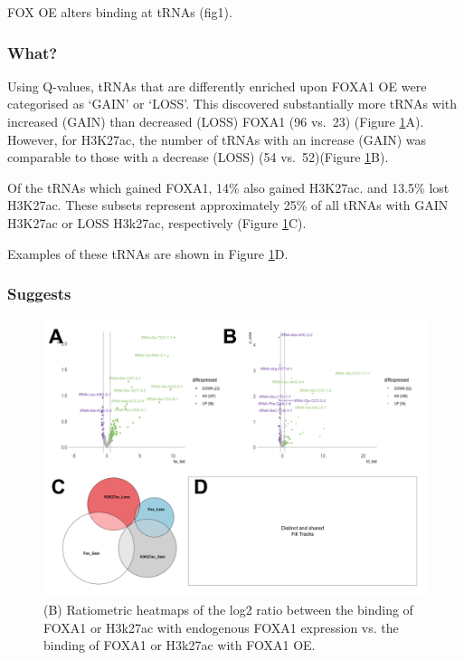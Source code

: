 \documentclass[
  12pt,
]{article}
\begin{document}
FOX OE alters binding at tRNAs (fig1).

\hypertarget{what}{%
\subsubsection{What?}\label{what}}

Using Q-values, tRNAs that are differently enriched upon FOXA1 OE were categorised as `GAIN' or `LOSS'.
This discovered substantially more tRNAs with increased (GAIN) than decreased (LOSS) FOXA1 (96 vs.~23) (Figure \ref{fig:results-2}A).
However, for H3K27ac, the number of tRNAs with an increase (GAIN) was comparable to those with a decrease (LOSS) (54 vs.~52)(Figure \ref{fig:results-2}B).

Of the tRNAs which gained FOXA1, 14\% also gained H3K27ac.
and 13.5\% lost H3K27ac.
These subsets represent approximately 25\% of all tRNAs with GAIN H3K27ac or LOSS H3k27ac, respectively (Figure \ref{fig:results-2}C).

Examples of these tRNAs are shown in Figure \ref{fig:results-2}D.

\hypertarget{suggests}{%
\subsubsection{Suggests}\label{suggests}}

\begin{figure}[H]

{\centering \includegraphics[width=1\linewidth]{../images/results-02} 

}

\caption{(B) Ratiometric heatmaps of the log2 ratio between the binding of FOXA1 or H3k27ac with endogenous FOXA1 expression vs. the binding of FOXA1 or H3k27ac with FOXA1 OE.}\label{fig:results-2}
\end{figure}
\end{document}
